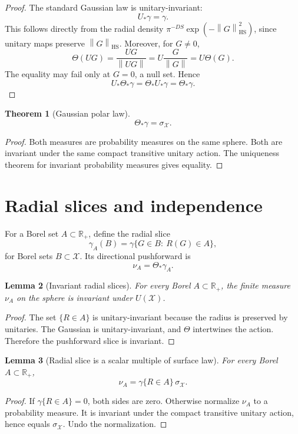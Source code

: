 \documentclass[11pt,oneside]{book}
\newtheorem{theorem}{Theorem}[chapter]
\newtheorem{lemma}[theorem]{Lemma}
\newcommand{\R}{\mathbb R}
\newcommand{\1}{\mathbf 1}
\newcommand{\HS}{\mathrm{HS}}
\newcommand{\norm}[1]{\left\|#1\right\|}
\begin{document}
\begin{proof}
The standard Gaussian law is unitary-invariant:
\[
  U_*\gamma=\gamma.
\]
This follows directly from the radial density
\(\pi^{-DS}\exp(-\norm G_{\HS}^2)\), since unitary maps preserve
\(\norm G_{\HS}\).
Moreover, for \(G\ne0\),
\[
  \Theta(UG)=\frac{UG}{\norm{UG}}=U\frac G{\norm G}=U\Theta(G).
\]
The equality may fail only at \(G=0\), a null set.  Hence
\[
  U_*\Theta_*\gamma=\Theta_*U_*\gamma=\Theta_*\gamma.
\]
\end{proof}

\begin{theorem}[Gaussian polar law]
\[
  \Theta_*\gamma=\sigma_{\mathcal X}.
\]
\end{theorem}

\begin{proof}
Both measures are probability measures on the same sphere.  Both are invariant
under the same compact transitive unitary action.  The uniqueness theorem for
invariant probability measures gives equality.
\end{proof}

\section{Radial slices and independence}

For a Borel set \(A\subset\R_+\), define the radial slice
\[
  \gamma_A(B)=\gamma\{G\in B:\ R(G)\in A\},
\]
for Borel sets \(B\subset\mathcal X\).
Its directional pushforward is
\[
  \nu_A=\Theta_*\gamma_A.
\]

\begin{lemma}[Invariant radial slices]
For every Borel \(A\subset\R_+\), the finite measure \(\nu_A\) on the sphere
is invariant under \(U(\mathcal X)\).
\end{lemma}

\begin{proof}
The set \(\{R\in A\}\) is unitary-invariant because the radius is preserved by
unitaries.  The Gaussian is unitary-invariant, and \(\Theta\) intertwines the
action.  Therefore the pushforward slice is invariant.
\end{proof}

\begin{lemma}[Radial slice is a scalar multiple of surface law]
For every Borel \(A\subset\R_+\),
\[
  \nu_A=\gamma\{R\in A\}\,\sigma_{\mathcal X}.
\]
\end{lemma}

\begin{proof}
If \(\gamma\{R\in A\}=0\), both sides are zero.  Otherwise normalize \(\nu_A\)
to a probability measure.  It is invariant under the compact transitive
unitary action, hence equals \(\sigma_{\mathcal X}\).  Undo the normalization.
\end{proof}
\end{document}
